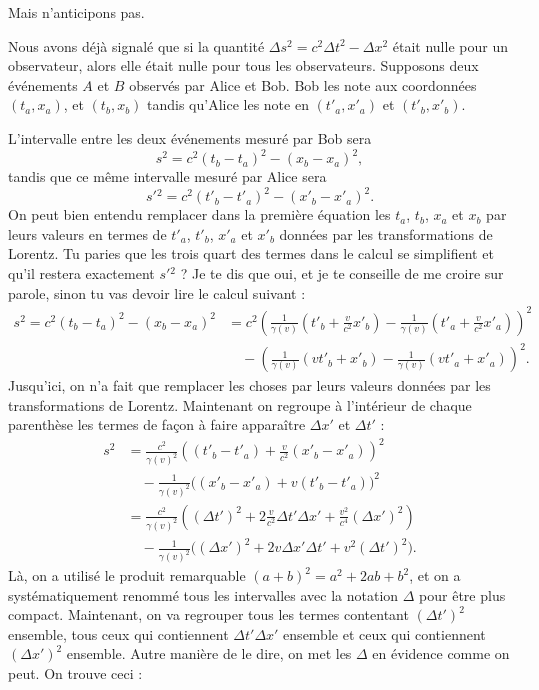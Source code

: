 \documentclass[a4paper,12pt]{book}
\theoremstyle{mes_exemples}	\newtheorem{exemple}[numtho]{Exemple}
\theoremstyle{mes_tho}
\begin{document}
Mais n'anticipons pas.

Nous avons déjà signalé que si la quantité $\Delta s^2=c^2\Delta t^2-\Delta x^2$ était nulle pour un observateur, alors elle était nulle pour tous les observateurs. Supposons deux événements $A$ et $B$ observés par Alice et Bob. Bob les note aux coordonnées $(t_a,x_a)$, et $(t_b,x_b)$ tandis qu'Alice les note en $(t'_a,x'_a)$ et $(t'_b,x'_b)$.

L'intervalle entre les deux événements mesuré par Bob sera
\[ 
   s^2=c^2(t_b-t_a)^2-(x_b-x_a)^2,
\]
tandis que ce même intervalle mesuré par Alice sera
\[ 
  s'{}^2=c^2(t'_b-t'_a)^2-(x'_b-x'_a)^2.
\]
On peut bien entendu remplacer dans la première équation les $t_a$, $t_b$, $x_a$ et $x_b$ par leurs valeurs en termes de $t'_a$, $t'_b$, $x'_a$ et $x'_b$ données par les transformations de Lorentz. Tu paries que les trois quart des termes dans le calcul se simplifient et qu'il restera exactement $s'{}^2$ ? Je te dis que oui, et je te conseille de me croire sur parole, sinon tu vas devoir lire le calcul suivant :
\begin{align*}
s^2=c^2(t_b-t_a)^2-(x_b-x_a)^2&=c^2\left(   \frac{1}{ \gamma(v) }(t'_b+\frac{ v }{ c^2 }x'_b)-\frac{1}{ \gamma(v) }(t'_a+\frac{ v }{ c^2 }x'_a)   \right)^2\\
			&\quad-\left(  \frac{1}{ \gamma(v) }(vt'_b+x'_b)-\frac{1}{ \gamma(v) }(vt'_a+x'_a)  \right)^2.
\end{align*}
Jusqu'ici, on n'a fait que remplacer les choses par leurs valeurs données par les transformations de Lorentz. Maintenant on regroupe à l'intérieur de chaque parenthèse les termes de façon à faire apparaître $\Delta x'$ et $\Delta t'$ :
\begin{align*}
s^2	&=\frac{ c^2 }{ \gamma(v)^2 }\left( (t'_b-t'_a)+\frac{ v }{ c^2 }(x'_b-x'_a) \right)^2\\
	&\quad-\frac{1}{ \gamma(v)^2 }\big( (x'_b-x'_a)+v(t'_b-t'_a) \big)^2\\
	&=\frac{ c^2 }{ \gamma(v)^2 }\left( (\Delta t')^2+2\frac{ v }{ c^2 }\Delta t'\Delta x'+\frac{ v^2 }{ c^4 }(\Delta x')^2 \right)\\
	&\quad-\frac{1}{ \gamma(v)^2 }\Big( (\Delta x')^2+2v\Delta x'\Delta t'+v^2(\Delta t')^2 \Big).
\end{align*}
Là, on a utilisé le produit remarquable $(a+b)^2=a^2+2ab+b^2$, et on a systématiquement renommé tous les intervalles avec la notation $\Delta$ pour être plus compact. Maintenant, on va regrouper tous les termes contentant $(\Delta t')^2$ ensemble, tous ceux qui contiennent $\Delta t'\Delta x'$ ensemble et ceux qui contiennent $(\Delta x')^2$ ensemble. Autre manière de le dire, on met les $\Delta$ en évidence comme on peut. On trouve ceci :
\end{document}
